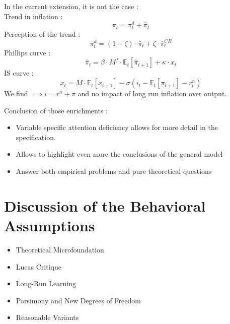\documentclass{beamer}
\newcommand\ReduceFont{\fontsize{10}{7.2}\selectfont}
\begin{document}
\begin{frame}{\subsecname}
    In the current extension, it is not the case : \\
    Trend in inflation :
    \begin{equation*}
        {\pi}_{t}=\pi^{d}_{t}+\hat{\pi}_{t}
    \end{equation*}
    Perception of the trend :
    \begin{equation}\tag{59}
        \pi^{d}_{t}=(1-\zeta)\cdot\bar{\pi}_{t}+\zeta\cdot\bar{\pi}_{t}^{CB}
    \end{equation}
    Phillips curve :
    \begin{equation}\tag{61}
        \hat{\pi}_{t}=\beta\cdot M^{f}\cdot\mathbb{E}_t\left[\hat{\pi}_{t+1}\right]+\kappa\cdot x_{t}
    \end{equation}
    IS curve :
    \begin{equation}\tag{60}
        x_{t}=M\cdot\mathbb{E}_{t}\left[x_{t+1}\right]-\sigma\left(i_{t}-\mathbb{E}_{t}\left[\pi_{t+1}\right]-r^{n}_{t}\right)
    \end{equation}
    We find $\implies i=r^{n}+\bar{\pi}$ and no impact of long run inflation over output.
\end{frame}

\begin{frame}
    Conclusion of those enrichments :
    \begin{itemize}
        \item Variable specific attention deficiency allows for more detail in the specification.
        \item Allows to highlight even more the conclusions of the general model
        \item Answer both empirical problems and pure theoretical questions
    \end{itemize}
\end{frame}

\section{Discussion of the Behavioral Assumptions}
\begin{frame}
    \ReduceFont
\end{frame}

\begin{frame}
    \begin{itemize}
        \item Theoretical Microfoundation
        \item Lucas Critique
        \item Long-Run Learning
        \item Parsimony and New Degrees of Freedom
        \item Reasonable Variants
    \end{itemize}
\end{frame}
\end{document}
